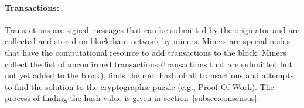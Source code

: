 \paragraph{Transactions:} Transactions are signed messages that can be
submitted by the originator and are collected and stored on blockchain network
by miners. Miners are special nodes that have the computational resource to add
transactions to the block. Miners collect the list of unconfirmed transactions
(transactions that are submitted but not yet added to the block), finds the root
hash of all transactions and attempts to find the solution to the cryptographic
puzzle (e.g., Proof-Of-Work). The process of finding the hash value is given in
section~\ref{subsec:consensus}.

